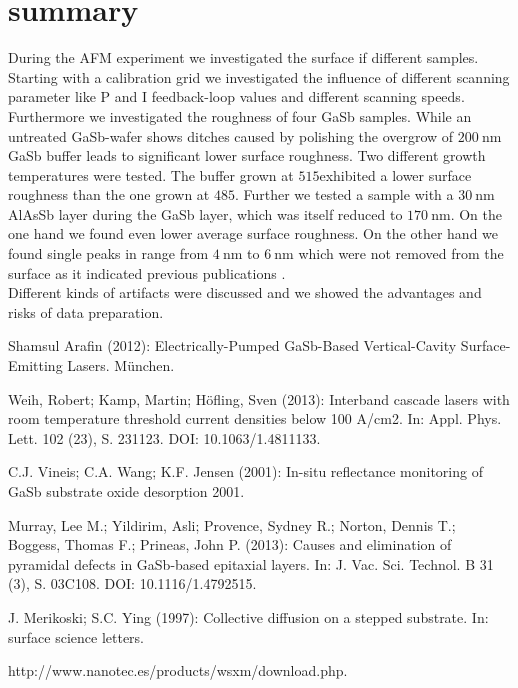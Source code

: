 \documentclass[paper=a4,fontsize=10pt,DIV=18,twocolumn,parskip=half]{scrartcl}
\numberwithin{equation}{section}    %
\begin{document}
\section{summary}
During the AFM experiment we investigated the surface if different samples.  
Starting with a calibration grid we investigated the influence of different 
scanning parameter like P and I feedback-loop values and different scanning 
speeds. Furthermore we investigated the roughness of four GaSb samples. While an 
untreated GaSb-wafer shows ditches caused by polishing the overgrow of 
$\SI{200}{\nano\meter}$ GaSb buffer leads to significant lower surface 
roughness. Two different growth temperatures were tested.
The buffer grown at $515$\textdegree exhibited a lower surface roughness than 
the one grown at $485$\textdegree. Further we tested a sample with a 
$\SI{30}{\nano\meter}$ AlAsSb layer during the GaSb layer, which was itself 
reduced to $\SI{170}{\nano\meter}$. On the one hand we found even lower average 
surface roughness. On the other hand we found single peaks in range from 
$\SI{4}{\nano\meter}$ to $\SI{6}{\nano\meter}$ which were not removed from the 
surface as it indicated previous publications \cite{murray}.\\
Different kinds of artifacts were discussed and we showed the advantages and 
risks of data preparation.

\begin{thebibliography}{}   

 Shamsul Arafin (2012): Electrically-Pumped GaSb-Based 
Vertical-Cavity Surface-Emitting Lasers. München.

 Weih, Robert; Kamp, Martin; Höfling, Sven (2013): Interband 
cascade lasers with room temperature threshold current densities below 100 
A/cm2. In: Appl. Phys. Lett. 102 (23), S. 231123. DOI: 10.1063/1.4811133.

 C.J. Vineis; C.A. Wang; K.F. Jensen (2001): In-situ reflectance 
monitoring of GaSb substrate oxide desorption 2001.

 Murray, Lee M.; Yildirim, Asli; Provence, Sydney R.; Norton, 
Dennis T.; Boggess, Thomas F.; Prineas, John P. (2013): Causes and elimination 
of pyramidal defects in GaSb-based epitaxial layers. In: J. Vac. Sci. Technol. B 
31 (3), S. 03C108. DOI: 10.1116/1.4792515.
  
 J. Merikoski; S.C. Ying (1997): Collective diffusion on a 
stepped substrate. In: surface science letters.

 http://www.nanotec.es/products/wsxm/download.php. 
\end{thebibliography}
%
%
\onecolumn
\pagestyle{empty}
\appendix

\end{document}

